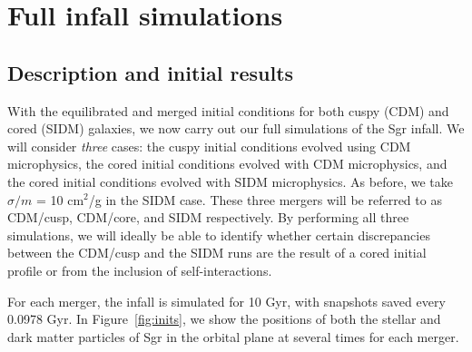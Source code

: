 \hypertarget{full-infall-simulations}{%
\chapter{Full infall simulations}\label{full-infall-simulations}}

\hypertarget{description-and-initial-results}{%
\section{Description and initial
results}\label{description-and-initial-results}}

With the equilibrated and merged initial conditions for both cuspy (CDM) and
cored (SIDM) galaxies, we now carry out our full simulations of the Sgr
infall.  We will consider \emph{three} cases: the cuspy initial conditions
evolved using CDM microphysics, the cored initial conditions evolved with CDM
microphysics, and the cored initial conditions evolved with SIDM microphysics.
As before, we take \(\sigma / m\) = 10 cm\(^2\)/g in the SIDM case.  These
three mergers will be referred to as CDM/cusp, CDM/core, and SIDM
respectively.  By performing all three simulations, we will ideally be able to
identify whether certain discrepancies between the CDM/cusp and the SIDM runs
are the result of a cored initial profile or from the inclusion of
self-interactions.

For each merger, the infall is simulated for 10 Gyr, with snapshots saved
every 0.0978 Gyr.  In Figure~\ref{fig:inits}, we show the positions of both the
stellar and dark matter particles of Sgr in the orbital plane at several times
for each merger.

